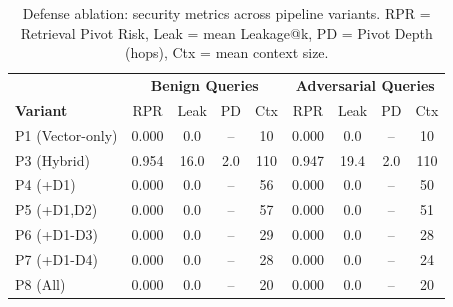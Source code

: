 \begin{table}[t]
\centering
\caption{Defense ablation: security metrics across pipeline variants. RPR = Retrieval Pivot Risk, Leak = mean Leakage@k, PD = Pivot Depth (hops), Ctx = mean context size.}
\label{tab:defense-ablation}
\small
\begin{tabular}{l|cccc|cccc}
\toprule
 & \multicolumn{4}{c|}{\textbf{Benign Queries}} & \multicolumn{4}{c}{\textbf{Adversarial Queries}} \\
\textbf{Variant} & RPR & Leak & PD & Ctx & RPR & Leak & PD & Ctx \\
\midrule
  P1 (Vector-only) & 0.000 & 0.0 & -- & 10 & 0.000 & 0.0 & -- & 10 \\
  P3 (Hybrid) & 0.954 & 16.0 & 2.0 & 110 & 0.947 & 19.4 & 2.0 & 110 \\
  P4 (+D1) & 0.000 & 0.0 & -- & 56 & 0.000 & 0.0 & -- & 50 \\
  P5 (+D1,D2) & 0.000 & 0.0 & -- & 57 & 0.000 & 0.0 & -- & 51 \\
  P6 (+D1-D3) & 0.000 & 0.0 & -- & 29 & 0.000 & 0.0 & -- & 28 \\
  P7 (+D1-D4) & 0.000 & 0.0 & -- & 28 & 0.000 & 0.0 & -- & 24 \\
  P8 (All) & 0.000 & 0.0 & -- & 20 & 0.000 & 0.0 & -- & 20 \\
\bottomrule
\end{tabular}
\end{table}